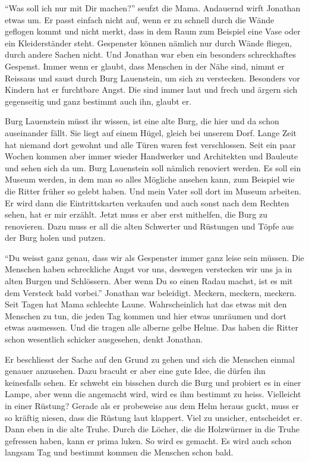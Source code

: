 \enquote{Was soll ich nur mit Dir machen?} seufzt die Mama. Andauernd wirft Jonathan etwas um. Er passt einfach nicht auf, wenn er zu schnell durch die Wände geflogen kommt und nicht merkt, dass in dem Raum zum Beispiel eine Vase oder ein Kleiderständer steht. Gespenster können nämlich nur durch Wände fliegen, durch andere Sachen nicht. Und Jonathan war eben ein besonders schreckhaftes Gespenst. Immer wenn er glaubt, dass Menschen in der Nähe sind, nimmt er Reissaus und saust durch Burg Lauenstein, um sich zu verstecken. Besonders vor Kindern hat er furchtbare Angst. Die sind immer laut und frech und ärgern sich gegenseitig und ganz bestimmt auch ihn, glaubt er. 
\medskip
\begin{mdframed}[style=mystyle]
Burg Lauenstein müsst ihr wissen, ist eine alte Burg, die hier und da schon auseinander fällt. Sie liegt auf einem Hügel, gleich bei unserem Dorf. Lange Zeit hat niemand dort gewohnt und alle Türen waren fest verschlossen. Seit ein paar Wochen kommen aber immer wieder Handwerker und Architekten und Bauleute und sehen sich da um. Burg Lauenstein soll nämlich renoviert werden. Es soll ein Museum werden, in dem man so alles Mögliche ansehen kann, zum Beispiel wie die Ritter früher so gelebt haben. Und mein Vater soll dort im Museum arbeiten. Er wird dann die Eintrittskarten verkaufen und auch sonst nach dem Rechten sehen, hat er mir erzählt. Jetzt muss er aber erst mithelfen, die Burg zu renovieren. Dazu muss er all die alten Schwerter und Rüstungen und Töpfe aus der Burg holen und putzen.
\end{mdframed}\medskip

\enquote{Du weisst ganz genau, dass wir als Gespenster immer ganz leise sein müssen. Die Menschen haben schreckliche Angst vor uns, deswegen verstecken wir uns ja in alten Burgen und Schlössern. Aber wenn Du so einen Radau machst, ist es mit dem Versteck bald vorbei.} Jonathan war beleidigt. Meckern, meckern, meckern. Seit Tagen hat Mama schlechte Laune. Wahrscheinlich hat das etwas mit den Menschen zu tun, die jeden Tag kommen und hier etwas umräumen und dort etwas ausmessen. Und die tragen alle alberne gelbe Helme. Das haben die Ritter schon wesentlich schicker ausgesehen, denkt Jonathan. 

Er beschliesst der Sache auf den Grund zu gehen und sich die Menschen einmal genauer anzusehen. Dazu bracuht er aber eine gute Idee, die dürfen ihn keinesfalls sehen. Er schwebt ein bisschen durch die Burg und probiert es in einer Lampe, aber wenn die angemacht wird, wird es ihm bestimmt zu heiss. Vielleicht in einer Rüstung? Gerade als er probeweise aus dem Helm heraus guckt, muss er so kräftig niesen, dass die Rüstung laut klappert. Viel zu unsicher, entscheidet er. Dann eben in die alte Truhe. Durch die Löcher, die die Holzwürmer in die Truhe gefressen haben, kann er prima luken. So wird es gemacht. Es wird auch schon langsam Tag und bestimmt kommen die Menschen schon bald. 

